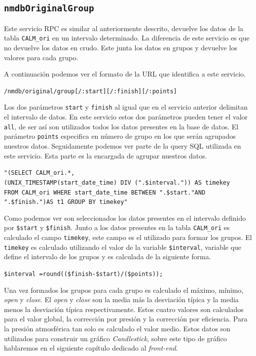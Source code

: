 	\subsection{\texttt{nmdbOriginalGroup}}
		Este servicio RPC es similar al anteriormente descrito, devuelve los datos de la tabla \texttt{CALM\_ori} en un intervalo determinado.
		La diferencia de este servicio es que no devuelve los datos en crudo. Este junta los datos en grupos y devuelve los valores para
		cada grupo. 
		\par
		A continuación podemos ver el formato de la URL que identifica a este servicio.
			\begin{center} \texttt{/nmdb/original/group[/:start][/:finish][/:points]}  \end{center} 
		Los dos parámetros \texttt{start} y \texttt{finish} al igual que en el servicio anterior delimitan el intervalo de datos. En este
		servicio estos dos parámetros pueden tener el valor \texttt{all}, de ser así son utilizados todos los datos presentes en la base de
		datos. El parámetro \texttt{points} especifica en número de grupo en los que serán agrupados nuestros datos.
		Seguidamente podemos ver parte de la query SQL utilizada en este servicio. Esta parte es la encargada de agrupar nuestros datos.
			\begin{center} \texttt{"(SELECT CALM\_ori.*,
			  		\\	(UNIX\_TIMESTAMP(start\_date\_time) DIV (".\$interval.")) AS timekey  
				      	\\	FROM CALM\_ori WHERE start\_date\_time BETWEEN \cc".\$start."\cc AND \cc".\$finish."\cc)AS t1  GROUP BY timekey"}
			\end{center} 
		Como podemos ver son seleccionados los datos presentes en el intervalo definido por \texttt{\$start} y \texttt{\$finish}. Junto a los datos
		presentes en la tabla \texttt{CALM\_ori} es calculado el campo \texttt{timekey}, este campo es el utilizado para formar los grupos. El 
		\texttt{timekey} es calculado utilizando el valor de la variable \texttt{\$interval}, variable que define el intervalo de los grupos
		y es calculada de la siguiente forma.
			\begin{center} \texttt{\$interval =round((\$finish-\$start)/(\$points));}  \end{center} 
		Una vez formados los grupos para cada grupo es calculado el máximo, mínimo, \emph{open} y \emph{close}. El \emph{open} y \emph{close}
		son la media más la desviación típica y la media menos la desviación típica respectivamente. Estos cuatro valores son calculados para el
		valor global, la corrección por presión y la corrección por eficiencia. Para la presión atmosférica tan solo es calculado el valor
		medio. Estos datos son utilizados para construir un gráfico \emph{Candlestick}, sobre este tipo de gráfico hablaremos en el
		siguiente capítulo dedicado al \emph{front-end}.

